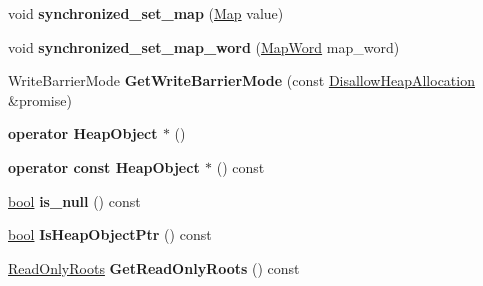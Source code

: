 \begin{DoxyCompactItemize}
\mbox{\label{classv8_1_1internal_1_1HeapObjectPtr_aecd710c437646ebe1691464eec925dc0}} 
void {\bfseries synchronized\+\_\+set\+\_\+map} (\mbox{\hyperlink{classv8_1_1internal_1_1Map}{Map}} value)
\item 
\mbox{\label{classv8_1_1internal_1_1HeapObjectPtr_a883be44fb259d3e24c5e10bdbac12b79}} 
void {\bfseries synchronized\+\_\+set\+\_\+map\+\_\+word} (\mbox{\hyperlink{classv8_1_1internal_1_1MapWord}{Map\+Word}} map\+\_\+word)
\item 
\mbox{\label{classv8_1_1internal_1_1HeapObjectPtr_a4385e1a7c062a70c187278c8bbcf46ba}} 
Write\+Barrier\+Mode {\bfseries Get\+Write\+Barrier\+Mode} (const \mbox{\hyperlink{classv8_1_1internal_1_1PerThreadAssertScopeDebugOnly}{Disallow\+Heap\+Allocation}} \&promise)
\item 
\mbox{\label{classv8_1_1internal_1_1HeapObjectPtr_ac91475e3e5529ce57c17bba4af2a8d83}} 
{\bfseries operator Heap\+Object $\ast$} ()
\item 
\mbox{\label{classv8_1_1internal_1_1HeapObjectPtr_aaa125b2f8798a6e781c6c1b75ec4fb08}} 
{\bfseries operator const Heap\+Object $\ast$} () const
\item 
\mbox{\label{classv8_1_1internal_1_1HeapObjectPtr_a46d110d13cdc25993b86efc80a24d1cb}} 
\mbox{\hyperlink{classbool}{bool}} {\bfseries is\+\_\+null} () const
\item 
\mbox{\label{classv8_1_1internal_1_1HeapObjectPtr_a7e65d12723559e0761358353d98ba4a4}} 
\mbox{\hyperlink{classbool}{bool}} {\bfseries Is\+Heap\+Object\+Ptr} () const
\item 
\mbox{\label{classv8_1_1internal_1_1HeapObjectPtr_a83890f301c6d00aae09624c867606b22}} 
\mbox{\hyperlink{classv8_1_1internal_1_1ReadOnlyRoots}{Read\+Only\+Roots}} {\bfseries Get\+Read\+Only\+Roots} () const
\item 
\mbox{\label{classv8_1_1internal_1_1HeapObjectPtr_abd003cb1b4b0cac05310d6b480039c0b}} 

\end{DoxyCompactItemize}
